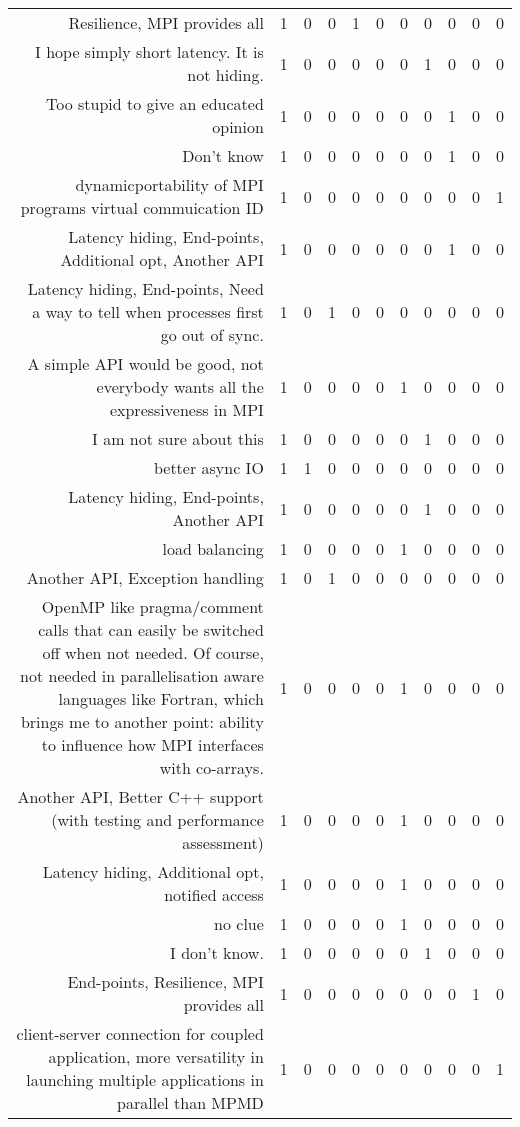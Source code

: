 {\begin{landscape}
\begin{longtable}[htb]{r|c|c|c|c|c|c|c|c|c|c}
{Resilience, MPI provides all} & 1 & 0 & 0 & 1 & 0 & 0 & 0 & 0 & 0 & 0 \\%
{I hope simply short latency.  It is not hiding.} & 1 & 0 & 0 & 0 & 0 & 0 & 1 & 0 & 0 & 0 \\%
{Too stupid to give an educated opinion} & 1 & 0 & 0 & 0 & 0 & 0 & 0 & 1 & 0 & 0 \\%
{Don't know} & 1 & 0 & 0 & 0 & 0 & 0 & 0 & 1 & 0 & 0 \\%
{dynamicportability of MPI programs virtual commuication ID} & 1 & 0 & 0 & 0 & 0 & 0 & 0 & 0 & 0 & 1 \\%
{Latency hiding, End-points, Additional opt, Another API} & 1 & 0 & 0 & 0 & 0 & 0 & 0 & 1 & 0 & 0 \\%
{Latency hiding, End-points, Need a way to tell when processes first go out of sync.} & 1 & 0 & 1 & 0 & 0 & 0 & 0 & 0 & 0 & 0 \\%
{A simple API would be good, not everybody wants all the expressiveness in MPI} & 1 & 0 & 0 & 0 & 0 & 1 & 0 & 0 & 0 & 0 \\%
{I am not sure about this} & 1 & 0 & 0 & 0 & 0 & 0 & 1 & 0 & 0 & 0 \\%
{better async IO} & 1 & 1 & 0 & 0 & 0 & 0 & 0 & 0 & 0 & 0 \\%
{Latency hiding, End-points, Another API} & 1 & 0 & 0 & 0 & 0 & 0 & 1 & 0 & 0 & 0 \\%
{load balancing} & 1 & 0 & 0 & 0 & 0 & 1 & 0 & 0 & 0 & 0 \\%
{Another API, Exception handling} & 1 & 0 & 1 & 0 & 0 & 0 & 0 & 0 & 0 & 0 \\%
{OpenMP like pragma/comment calls that can easily be switched off when not needed. Of course, not needed in parallelisation aware languages like Fortran, which brings me to another point: ability to influence how MPI interfaces with co-arrays.} & 1 & 0 & 0 & 0 & 0 & 1 & 0 & 0 & 0 & 0 \\%
{Another API, Better C++ support (with testing and performance assessment)} & 1 & 0 & 0 & 0 & 0 & 1 & 0 & 0 & 0 & 0 \\%
{Latency hiding, Additional opt, notified access} & 1 & 0 & 0 & 0 & 0 & 1 & 0 & 0 & 0 & 0 \\%
{no clue} & 1 & 0 & 0 & 0 & 0 & 1 & 0 & 0 & 0 & 0 \\%
{I don't know.} & 1 & 0 & 0 & 0 & 0 & 0 & 1 & 0 & 0 & 0 \\%
{End-points, Resilience, MPI provides all} & 1 & 0 & 0 & 0 & 0 & 0 & 0 & 0 & 1 & 0 \\%
{client-server connection for coupled application, more versatility in launching multiple applications in parallel than MPMD} & 1 & 0 & 0 & 0 & 0 & 0 & 0 & 0 & 0 & 1 \\%

\end{longtable}
\end{landscape}}
